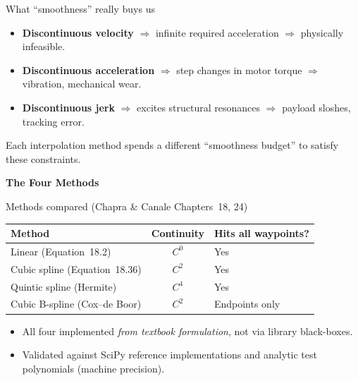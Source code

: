\documentclass[aspectratio=169]{beamer}
\newcommand{\highlight}[1]{\textcolor{red!70!black}{\textbf{#1}}}
\newcommand{\sectiondivider}[1]{%
    \begin{frame}[plain]
    \begin{center}
    \Huge\bfseries\color{structure} #1
    \end{center}
    \end{frame}%
}
\begin{document}
\begin{frame}{What ``smoothness'' really buys us}
\begin{itemize}
    \item \highlight{Discontinuous velocity} $\Rightarrow$
          infinite required acceleration $\Rightarrow$ physically
          infeasible.
    \item \highlight{Discontinuous acceleration} $\Rightarrow$ step
          changes in motor torque $\Rightarrow$ vibration, mechanical wear.
    \item \highlight{Discontinuous jerk} $\Rightarrow$ excites
          structural resonances $\Rightarrow$ payload sloshes,
          tracking error.
\end{itemize}
\vspace{0.5em}
\centering
Each interpolation method spends a different ``smoothness budget'' to
satisfy these constraints.
\end{frame}

\sectiondivider{The Four Methods}

\begin{frame}{Methods compared (Chapra \& Canale Chapters~18, 24)}
\centering
\renewcommand{\arraystretch}{1.3}
\begin{tabular}{l c l}
\toprule
\textbf{Method} & \textbf{Continuity} & \textbf{Hits all waypoints?} \\
\midrule
Linear (Equation~18.2)               & $C^0$ & Yes \\
Cubic spline (Equation~18.36)        & $C^2$ & Yes \\
Quintic spline (Hermite)             & $C^4$ & Yes \\
Cubic B-spline (Cox--de Boor)        & $C^2$ & Endpoints only \\
\bottomrule
\end{tabular}
\vspace{1em}
\begin{itemize}
    \item All four implemented \emph{from textbook formulation},
          not via library black-boxes.
    \item Validated against SciPy reference implementations and
          analytic test polynomials (machine precision).
\end{itemize}
\end{frame}
\end{document}
